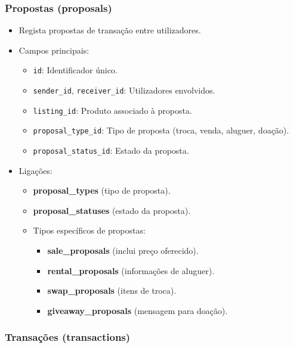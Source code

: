 \documentclass[a4paper, 12pt]{article} %
\begin{document}
\subsubsection{\textbf{Propostas (proposals)}}

\begin{itemize}
    \item Regista propostas de transação entre utilizadores.
    \item Campos principais:
    \begin{itemize}
        \item \verb|id|: Identificador único.
        \item \verb|sender_id|, \verb|receiver_id|: Utilizadores envolvidos.
        \item \verb|listing_id|: Produto associado à proposta.
        \item \verb|proposal_type_id|: Tipo de proposta (troca, venda, aluguer, doação).
        \item \verb|proposal_status_id|: Estado da proposta.
    \end{itemize}
    \item Ligações:
    \begin{itemize}
        \item \textbf{proposal\_types} (tipo de proposta).
        \item \textbf{proposal\_statuses} (estado da proposta).
        \item Tipos específicos de propostas:
        \begin{itemize}
            \item \textbf{sale\_proposals} (inclui preço oferecido).
            \item \textbf{rental\_proposals} (informações de aluguer).
            \item \textbf{swap\_proposals} (itens de troca).
            \item \textbf{giveaway\_proposals} (mensagem para doação).
        \end{itemize}
    \end{itemize}
\end{itemize}

\subsubsection{\textbf{Transações (transactions)}}
\end{document}
